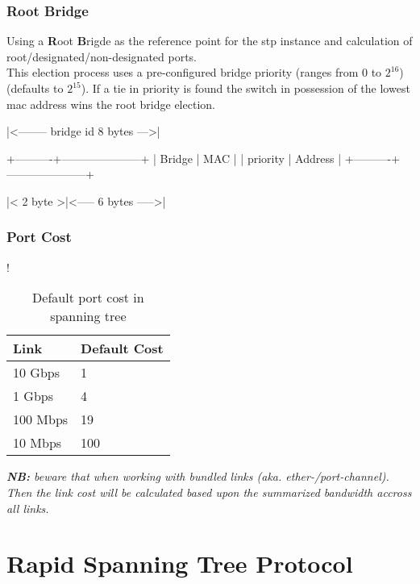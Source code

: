 \subsubsection{Root Bridge}
Using a \textbf{R}oot \textbf{B}rigde as the reference point for the \gls{stp} instance and calculation of root/designated/non-designated ports.\\This election process uses a pre-configured bridge priority (ranges from $0$ to $2^{16}$) (defaults to $2^{15}$). If a tie in priority is found the switch in possession of the lowest \gls{mac} address wins the root bridge election.

\begin{txt}
|<-------- bridge id 8 bytes --->|

+----------+---------------------+
| Bridge   |        MAC          |
| priority |       Address       |
+----------+---------------------+

|< 2 byte >|<----- 6 bytes ----->|
\end{txt}

\subsubsection{Port Cost}

\begin{table}[h]
    \centering
    \caption{Default port cost in spanning tree}
    \label{stpportcost}{!}{%
        \begin{tabular}{|l|l|}
            \hline
            \textbf{Link} & \textbf{Default Cost} \\ \hline
            10 Gbps & 1 \\ \hline
            1 Gbps & 4 \\ \hline
            100 Mbps & 19 \\ \hline
            10 Mbps & 100 \\ \hline
        \end{tabular}%
    }
\end{table}


\textit{\textbf{NB:} beware that when working with bundled links (aka. ether-/port-channel). Then the link cost will be calculated based upon the summarized bandwidth accross all links.}


\section{Rapid Spanning Tree Protocol}

